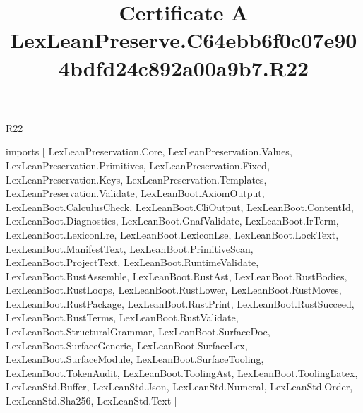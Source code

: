\begin{lexlean}{R22}
\title{Certificate A LexLeanPreserve.C64ebb6f0c07e904bdfd24c892a00a9b7.R22}
\begin{coremodule}
imports [
  LexLeanPreservation.Core,
  LexLeanPreservation.Values,
  LexLeanPreservation.Primitives,
  LexLeanPreservation.Fixed,
  LexLeanPreservation.Keys,
  LexLeanPreservation.Templates,
  LexLeanPreservation.Validate,
  LexLeanBoot.AxiomOutput,
  LexLeanBoot.CalculusCheck,
  LexLeanBoot.CliOutput,
  LexLeanBoot.ContentId,
  LexLeanBoot.Diagnostics,
  LexLeanBoot.GnafValidate,
  LexLeanBoot.IrTerm,
  LexLeanBoot.LexiconLre,
  LexLeanBoot.LexiconLse,
  LexLeanBoot.LockText,
  LexLeanBoot.ManifestText,
  LexLeanBoot.PrimitiveScan,
  LexLeanBoot.ProjectText,
  LexLeanBoot.RuntimeValidate,
  LexLeanBoot.RustAssemble,
  LexLeanBoot.RustAst,
  LexLeanBoot.RustBodies,
  LexLeanBoot.RustLoops,
  LexLeanBoot.RustLower,
  LexLeanBoot.RustMoves,
  LexLeanBoot.RustPackage,
  LexLeanBoot.RustPrint,
  LexLeanBoot.RustSucceed,
  LexLeanBoot.RustTerms,
  LexLeanBoot.RustValidate,
  LexLeanBoot.StructuralGrammar,
  LexLeanBoot.SurfaceDoc,
  LexLeanBoot.SurfaceGeneric,
  LexLeanBoot.SurfaceLex,
  LexLeanBoot.SurfaceModule,
  LexLeanBoot.SurfaceTooling,
  LexLeanBoot.TokenAudit,
  LexLeanBoot.ToolingAst,
  LexLeanBoot.ToolingLatex,
  LexLeanStd.Buffer,
  LexLeanStd.Json,
  LexLeanStd.Numeral,
  LexLeanStd.Order,
  LexLeanStd.Sha256,
  LexLeanStd.Text
]


\end{coremodule}
\end{lexlean}

